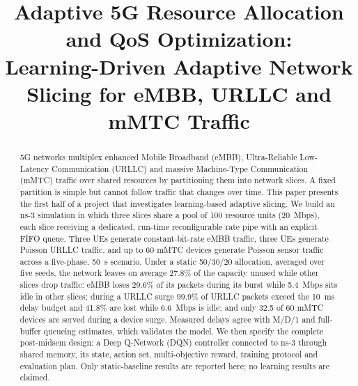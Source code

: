 \documentclass[conference]{IEEEtran}
\newcommand{\Ctot}{20~Mbps}
\newcommand{\Nunits}{100}
\begin{document}
\title{Adaptive 5G Resource Allocation and QoS Optimization:\\
Learning-Driven Adaptive Network Slicing for eMBB, URLLC and mMTC Traffic}

\author{
\and
{}
}

\maketitle

\begin{abstract}
5G networks multiplex enhanced Mobile Broadband (eMBB), Ultra-Reliable Low-Latency Communication (URLLC) and massive Machine-Type Communication (mMTC) traffic over shared resources by partitioning them into network slices. A fixed partition is simple but cannot follow traffic that changes over time. This paper presents the first half of a project that investigates learning-based adaptive slicing. We build an ns-3 simulation in which three slices share a pool of \Nunits{} resource units (\Ctot{}), each slice receiving a dedicated, run-time reconfigurable rate pipe with an explicit FIFO queue. Three UEs generate constant-bit-rate eMBB traffic, three UEs generate Poisson URLLC traffic, and up to 60 mMTC devices generate Poisson sensor traffic across a five-phase, 50~s scenario. Under a static 50/30/20 allocation, averaged over five seeds, the network leaves on average 27.8\% of the capacity unused while other slices drop traffic: eMBB loses 29.6\% of its packets during its burst while 5.4~Mbps sits idle in other slices; during a URLLC surge 99.9\% of URLLC packets exceed the 10~ms delay budget and 41.8\% are lost while 6.6~Mbps is idle; and only 32.5 of 60 mMTC devices are served during a device surge. Measured delays agree with M/D/1 and full-buffer queueing estimates, which validates the model. We then specify the complete post-midsem design: a Deep Q-Network (DQN) controller connected to ns-3 through shared memory, its state, action set, multi-objective reward, training protocol and evaluation plan. Only static-baseline results are reported here; no learning results are claimed.
\end{abstract}
\end{document}
